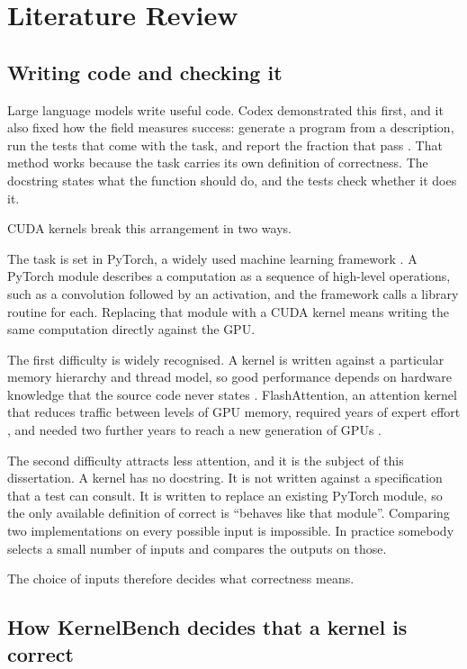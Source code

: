 \documentclass[12pt]{article}
\begin{document}
\section{Literature Review}

\subsection{Writing code and checking it}

Large language models write useful code. Codex demonstrated this first, and it
also fixed how the field measures success: generate a program from a
description, run the tests that come with the task, and report the fraction
that pass \citep{chen2021codex}. That method works because the task carries its
own definition of correctness. The docstring states what the function should
do, and the tests check whether it does it.

CUDA kernels break this arrangement in two ways.

The task is set in PyTorch, a widely used machine learning framework
\citep{paszke2019pytorch}. A PyTorch module describes a computation
as a sequence of high-level operations, such as a convolution followed by an
activation, and the framework calls a library routine for each. Replacing that
module with a CUDA kernel means writing the same computation directly against
the GPU.

The first difficulty is widely recognised. A kernel is written against a particular memory
hierarchy and thread model, so good performance depends on hardware knowledge
that the source code never states \citep{kirk2012programming}. FlashAttention,
an attention kernel that reduces traffic between levels of GPU memory, required
years of expert effort \citep{dao2022flashattention}, and needed two further
years to reach a new generation of GPUs \citep{ouyang2025kernelbench}.

The second difficulty attracts less attention, and it is the subject of this
dissertation. A kernel has no docstring. It is not written against a
specification that a test can consult. It is written to replace an existing
PyTorch module, so the only available definition of correct is ``behaves like
that module''. Comparing two implementations on every possible input is
impossible. In practice somebody selects a small number of inputs and compares
the outputs on those.

The choice of inputs therefore decides what correctness means.

\subsection{How KernelBench decides that a kernel is correct}
\label{sec:evaluated}
\end{document}
